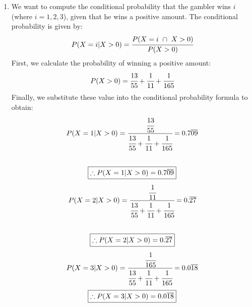\documentclass{article}
\begin{document}
\begin{enumerate}
\newpage
\item 
  We want to compute the conditional probability that the gambler wins $i$ (where $i = 1, 2, 3$), given that he wins a positive amount. The conditional probability is given by:
  \[
  P(X = i | X > 0) = \cfrac{P(X=i\  \cap\  X>0)}{P(X > 0)}
  \]
  First, we calculate the probability of winning a positive amount:
  \[
  P(X > 0) = \cfrac{13}{55} + \cfrac{1}{11} + \cfrac{1}{165}
  \]
  Finally, we substitute these value into the conditional probability formula to obtain:
  \begin{align*}
    P(X = 1 | X > 0) = \cfrac{\cfrac{13}{55}}{\cfrac{13}{55} + \cfrac{1}{11} + \cfrac{1}{165}} = 0.7\overline{09}\\\\
  \end{align*}
  \[
    \boxed{\therefore P(X = 1 | X > 0) = 0.7\overline{09}}\\
  \]
  \begin{align*}
    P(X = 2 | X > 0) = \cfrac{\cfrac{1}{11}}{\cfrac{13}{55} + \cfrac{1}{11} + \cfrac{1}{165}} = 0.\overline{27}\\\\
  \end{align*}
  \[
     \boxed{\therefore P(X = 2 | X > 0) = 0.\overline{27}}\\
  \]
  \begin{align*}
    P(X = 3 | X > 0) = \cfrac{\cfrac{1}{165}}{\cfrac{13}{55} + \cfrac{1}{11} + \cfrac{1}{165}} = 0.0\overline{18}\\
  \end{align*}
  \[
     \boxed{\therefore P(X = 3 | X > 0) = 0.0\overline{18}}\\
  \]


\end{enumerate}
\end{document}

